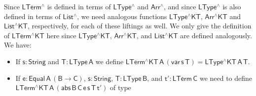 \documentclass[9pt]{entcs}
\begin{document}
\noindent
Since $\mathsf{LTerm^\wedge}$ is
defined in terms of $\mathsf{LType^\wedge}$ and $\mathsf{Arr^\wedge}$,
and since $\mathsf{LType^\wedge}$ is also defined in terms of
$\mathsf{List^\wedge}$, we need analogous functions
$\mathsf{LType^\wedge KT}$, $\mathsf{Arr^\wedge KT}$ and
$\mathsf{List^\wedge KT}$, respectively, for each of these liftings as
well.  We only give the definition of $\mathsf{LTerm^\wedge KT}$ here
since $\mathsf{LType^\wedge KT}$, $\mathsf{Arr^\wedge KT}$, and
$\mathsf{List^\wedge KT}$ are defined analogously. We have:
\begin{itemize}
\item If $\mathsf{s : String}$ and $\mathsf{T : LType\,A}$ we define
  $\mathsf{LTerm^\wedge KT\,A\,(var\,s\,T)} = \mathsf{LType^\wedge
  KT\,A\,T}$.
\item If $\mathsf{e : Equal\,A\,(B \to C)}$, $\mathsf{s : String}$,
  $\mathsf{T : LType\,B}$, and $\mathsf{t' : LTerm\,C}$ we need to
  define $\mathsf{LTerm^\wedge KT\,A\, (abs\, B \,C \, e \,s \,T \,
    t')}$ of type

\vspace*{-0.15in}


\end{itemize}
\end{document}
